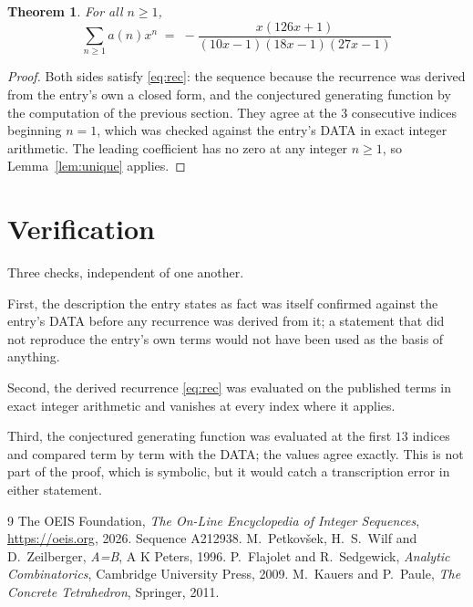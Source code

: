 \documentclass[11pt,a4paper]{article}
\theoremstyle{plain}
\newtheorem{theorem}{Theorem}
\theoremstyle{definition}
\begin{document}
\begin{theorem}
For all $n\ge 1$,
\[
\sum_{n\ge 1} a(n)x^{n} \;=\; - \frac{x \left(126 x + 1\right)}{\left(10 x - 1\right) \left(18 x - 1\right) \left(27 x - 1\right)}
\]
\end{theorem}

\begin{proof}
Both sides satisfy \eqref{eq:rec}: the sequence because the recurrence was derived from
the entry's own a closed form, and the conjectured generating function by the computation of the
previous section. They agree at the $3$ consecutive indices beginning
$n=1$, which was checked against the entry's DATA in exact integer arithmetic.
The leading coefficient has no zero at any integer $n\ge1$, so
Lemma~\ref{lem:unique} applies.
\end{proof}

\section{Verification}

Three checks, independent of one another.

First, the description the entry states as fact was itself confirmed against the entry's
DATA before any recurrence was derived from it; a statement that did not reproduce the
entry's own terms would not have been used as the basis of anything.

Second, the derived recurrence \eqref{eq:rec} was evaluated on the published terms in
exact integer arithmetic and vanishes at every index where it applies.

Third, the conjectured generating function was evaluated at the first $13$ indices and
compared term by term with the DATA; the values agree exactly. This is not part of the
proof, which is symbolic, but it would catch a transcription error in either statement.

\begin{thebibliography}{9}
 The OEIS Foundation, \emph{The On-Line Encyclopedia of Integer Sequences},
\url{https://oeis.org}, 2026. Sequence A212938.
 M.~Petkov\v{s}ek, H.~S.~Wilf and D.~Zeilberger, \emph{A=B}, A K Peters,
1996.
 P.~Flajolet and R.~Sedgewick, \emph{Analytic Combinatorics}, Cambridge
University Press, 2009.
 M.~Kauers and P.~Paule, \emph{The Concrete Tetrahedron}, Springer, 2011.
\end{thebibliography}
\end{document}
